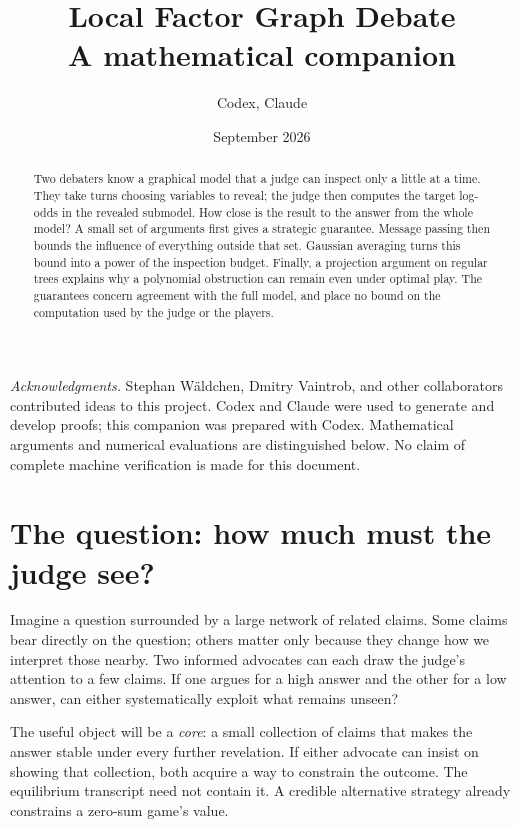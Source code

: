 \documentclass[11pt]{article}
\title{Local Factor Graph Debate\\\large A mathematical companion}
\author{Codex, Claude}
\date{September 2026}
\theoremstyle{definition}
\theoremstyle{remark}
\begin{document}
\maketitle
\begin{center}
\end{center}
\begin{abstract}
Two debaters know a graphical model that a judge can inspect only a little
at a time. They take turns choosing variables to reveal; the judge then
computes the target log-odds in the revealed submodel. How close is the
result to the answer from the whole model? A small set of arguments first
gives a strategic guarantee. Message passing then bounds the influence of everything
outside that set. Gaussian averaging turns this bound into a power of the
inspection budget. Finally, a projection argument on regular trees explains
why a polynomial obstruction can remain even under optimal play.
The guarantees concern agreement with the full model, and place no bound
on the computation used by the judge or the players.
\end{abstract}
\noindent\textit{Acknowledgments.} Stephan W\"aldchen, Dmitry Vaintrob, and
other collaborators contributed ideas to this project. Codex and Claude
were used to generate and develop proofs; this companion was prepared with
Codex. Mathematical arguments and numerical evaluations are distinguished
below. No claim of complete machine verification is made for this document.
\setcounter{tocdepth}{1}
\tableofcontents

\clearpage
\section{The question: how much must the judge see?}

Imagine a question surrounded by a large network of related claims.
Some claims bear directly on the question; others matter only because they
change how we interpret those nearby. Two informed advocates can each draw
the judge's attention to a few claims. If one argues for a high answer and
the other for a low answer, can either systematically exploit what remains
unseen?

The useful object will be a \emph{core}: a small collection of claims that
makes the answer stable under every further revelation. If either advocate
can insist on showing that collection, both acquire a way to constrain the
outcome. The equilibrium transcript need not contain it. A credible
alternative strategy already constrains a zero-sum game's value.
\end{document}

